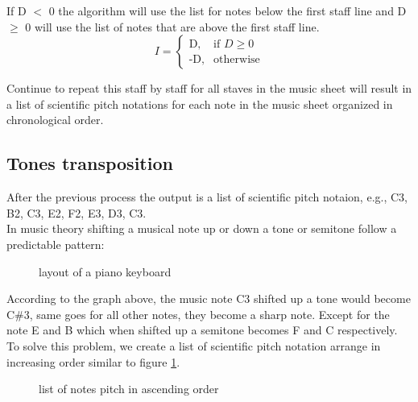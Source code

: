 \documentclass[a4paper,12pt]{report}
\begin{document}
If D $<$ 0 the algorithm will use the list for notes below the first staff line
and D $\geq$ 0 will use the list of notes that are above the first staff line.\\

\[ I = \begin{cases} \mbox{D,} & \mbox{if } D \geq 0 \\ \mbox{-D,} &
\mbox{otherwise} \end{cases}\]

Continue to repeat this staff by staff for all staves in the music sheet will
result in a list of scientific pitch notations for each note in the music sheet
organized in chronological order.\\

\subsection{Tones transposition}
After the previous process the output is a list of scientific pitch notaion,
e.g., C3, B2, C3, E2, F2, E3, D3, C3.\\

In music theory shifting a musical note up or down a tone or semitone follow a
predictable pattern:

\begin{figure}[h]
    \caption{layout of a piano keyboard}
    \label{piano_keyboard}
\end{figure}

According to the graph above, the music note C3 shifted up a tone would become
C\#3, same goes for all other notes, they become a sharp note. Except for the note
E and B which when shifted up a semitone becomes F and C respectively.\\

To solve this problem, we create a list of scientific pitch notation arrange in
increasing order similar to figure \ref{piano_keyboard}.\\

\begin{figure}[h]
\noindent{}
\caption{list of notes pitch in ascending order}
\label{list: note pitch increase}
\end{figure}
\end{document}
